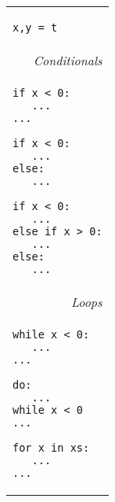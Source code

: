 \documentclass[a4paper,10pt,twcolumn]{article}
\begin{document}
\begin{tabular}{l}
\begin{minipage}[t]{1.75cm}
\begin{lstlisting}
x,y = t
\end{lstlisting}
\end{minipage}
\\
\multicolumn{1}{r}{\em Conditionals}\\
\begin{minipage}[t]{2.7cm}
\begin{lstlisting}
if x < 0:
   ...
...
\end{lstlisting}
\end{minipage} 
\hspace*{0.25cm}
\begin{minipage}[t]{2.25cm}
\begin{lstlisting}
if x < 0:
   ...
else:
   ...
\end{lstlisting}
\end{minipage}
\hspace*{0.25cm}
\begin{minipage}[t]{3cm}
\begin{lstlisting}
if x < 0:
   ...
else if x > 0:
   ...
else:
   ...
\end{lstlisting}
\end{minipage}\\
\multicolumn{1}{r}{\em Loops}\\
\begin{minipage}[t]{2.75cm}
\begin{lstlisting}
while x < 0:
   ...
...
\end{lstlisting}
\end{minipage}
\hspace*{0.2cm}
\begin{minipage}[t]{2.5cm}
\begin{lstlisting}
do:
   ...
while x < 0
...
\end{lstlisting}
\end{minipage}
\hspace*{0.2cm}
\begin{minipage}[t]{2.75cm}
\begin{lstlisting}
for x in xs:
   ...
...
\end{lstlisting}
\end{minipage}\\


\end{tabular}
\end{document}
